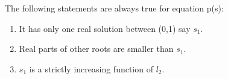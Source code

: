 \begin{subframe}
	The following statements are always true for equation p(s):
	\begin{enumerate}
		\item It has only one real solution between (0,1) say $s_1$.
		\item Real parts of other roots are smaller than $s_1$.
		\item $s_1$ is a strictly increasing function of $l_2$.
	\end{enumerate}
	\hyperlink{BetterSuff}{}~~\hyperlink{Conc:Approach1}{}
\end{subframe}

